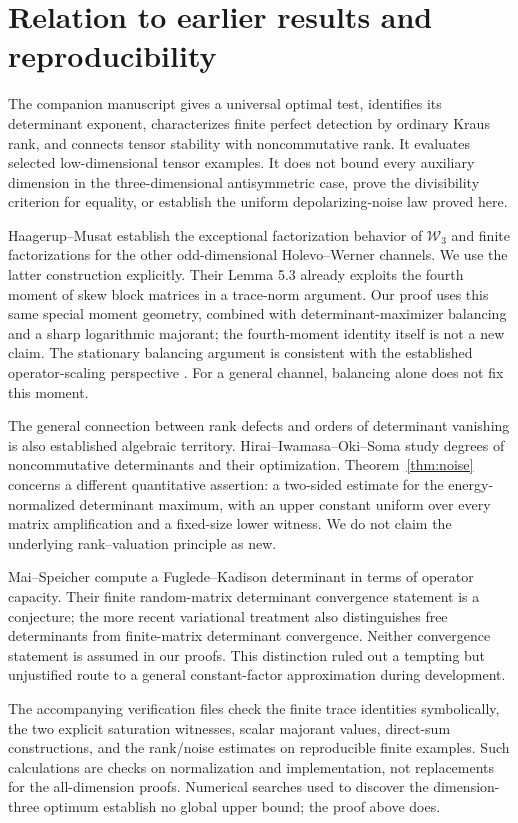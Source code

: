 \documentclass[11pt,a4paper]{article}
\theoremstyle{remark}\newtheorem{remark}[theorem]{Remark}
\newcommand{\W}{\mathcal W}
\begin{document}
\section{Relation to earlier results and reproducibility}
The companion manuscript \cite{previous} gives a universal optimal test, identifies its determinant exponent, characterizes finite perfect detection by ordinary Kraus rank, and connects tensor stability with noncommutative rank. It evaluates selected low-dimensional tensor examples. It does not bound every auxiliary dimension in the three-dimensional antisymmetric case, prove the divisibility criterion for equality, or establish the uniform depolarizing-noise law proved here.

Haagerup--Musat \cite{HM} establish the exceptional factorization behavior of \(\W_3\) and finite factorizations for the other odd-dimensional Holevo--Werner channels. We use the latter construction explicitly. Their Lemma 5.3 already exploits the fourth moment of skew block matrices in a trace-norm argument. Our proof uses this same special moment geometry, combined with determinant-maximizer balancing and a sharp logarithmic majorant; the fourth-moment identity itself is not a new claim. The stationary balancing argument is consistent with the established operator-scaling perspective \cite{GGOW}. For a general channel, balancing alone does not fix this moment.

The general connection between rank defects and orders of determinant vanishing is also established algebraic territory. Hirai--Iwamasa--Oki--Soma \cite{HIOS} study degrees of noncommutative determinants and their optimization. Theorem~\ref{thm:noise} concerns a different quantitative assertion: a two-sided estimate for the energy-normalized determinant maximum, with an upper constant uniform over every matrix amplification and a fixed-size lower witness. We do not claim the underlying rank--valuation principle as new.

Mai--Speicher \cite{MS} compute a Fuglede--Kadison determinant in terms of operator capacity. Their finite random-matrix determinant convergence statement is a conjecture; the more recent variational treatment \cite{Kargin} also distinguishes free determinants from finite-matrix determinant convergence. Neither convergence statement is assumed in our proofs. This distinction ruled out a tempting but unjustified route to a general constant-factor approximation during development.

The accompanying verification files check the finite trace identities symbolically, the two explicit saturation witnesses, scalar majorant values, direct-sum constructions, and the rank/noise estimates on reproducible finite examples. Such calculations are checks on normalization and implementation, not replacements for the all-dimension proofs. Numerical searches used to discover the dimension-three optimum establish no global upper bound; the proof above does.
\end{document}
